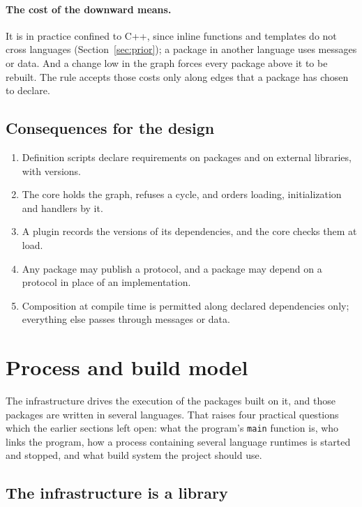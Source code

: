 \documentclass[11pt,a4paper]{article}
\newcommand{\code}[1]{\texttt{#1}}
\begin{document}
\paragraph{The cost of the downward means.}  It is in practice confined to
C++, since inline functions and templates do not cross languages
(Section~\ref{sec:prior}); a package in another language uses messages or
data.  And a change low in the graph forces every package above it to be
rebuilt.  The rule accepts those costs only along edges that a package has
chosen to declare.

\subsection{Consequences for the design}

\begin{enumerate}
  \item Definition scripts declare requirements on packages and on external
        libraries, with versions.
  \item The core holds the graph, refuses a cycle, and orders loading,
        initialization and handlers by it.
  \item A plugin records the versions of its dependencies, and the core
        checks them at load.
  \item Any package may publish a protocol, and a package may depend on a
        protocol in place of an implementation.
  \item Composition at compile time is permitted along declared
        dependencies only; everything else passes through messages or
        data.
\end{enumerate}

\section{Process and build model}
\label{sec:build}

The infrastructure drives the execution of the packages built on it, and
those packages are written in several languages.  That raises four practical
questions which the earlier sections left open: what the program's
\code{main} function is, who links the program, how a process containing
several language runtimes is started and stopped, and what build system the
project should use.

\subsection{The infrastructure is a library}
\end{document}
